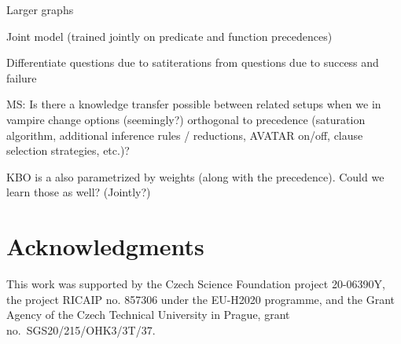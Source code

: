 \documentclass[runningheads]{llncs}
\begin{document}
Larger graphs

Joint model (trained jointly on predicate and function precedences)

Differentiate questions due to satiterations from questions due to success and failure

MS: Is there a knowledge transfer possible between related setups when we in vampire change
options (seemingly?) orthogonal to precedence (saturation algorithm, additional inference rules / reductions, AVATAR on/off,
clause selection strategies, etc.)?

KBO is a also parametrized by weights (along with the precedence). Could we learn those as well? (Jointly?)

\section*{Acknowledgments}



This work was supported by
the Czech Science Foundation project 20-06390Y,
the project RICAIP no. 857306 under the EU-H2020 programme,
and
the Grant Agency of the Czech Technical University in Prague, grant\\
no.~SGS20/215/OHK3/3T/37.




\end{document}
